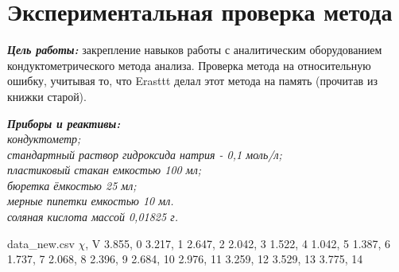 \documentclass{article}
\begin{document}
    \section*{Экспериментальная проверка метода}
   \textbf{\textit{Цель работы:}} 
   закрепление навыков работы с аналитическим оборудованием кондуктометрического метода анализа. Проверка метода на относительную ошибку,
   учитывая то, что Erasttt делал этот метода на память (прочитав из книжки старой).
   \begin{flushleft}
    \textbf{\textit{Приборы и реактивы:}} \\
    \textit{кондуктометр;} \\
    \textit{стандартный раствор гидроксида натрия - 0,1 моль/л;} \\
    \textit{пластиковый стакан емкостью 100 мл;} \\
    \textit{бюретка ёмкостью 25 мл;} \\
    \textit{мерные пипетки емкостью 10 мл.} \\
    \textit{соляная кислота массой 0,01825 г.}
    \end{flushleft}
    
       \begin{filecontents*}{data_new.csv}
    $\chi$, V
    3.855, 0
    3.217, 1
    2.647, 2
    2.042, 3
    1.522, 4
    1.042, 5
    1.387, 6
    1.737, 7
    2.068, 8
    2.396, 9
    2.684, 10
    2.976, 11
    3.259, 12
    3.529, 13
    3.775, 14
\end{filecontents*}
\end{document}

